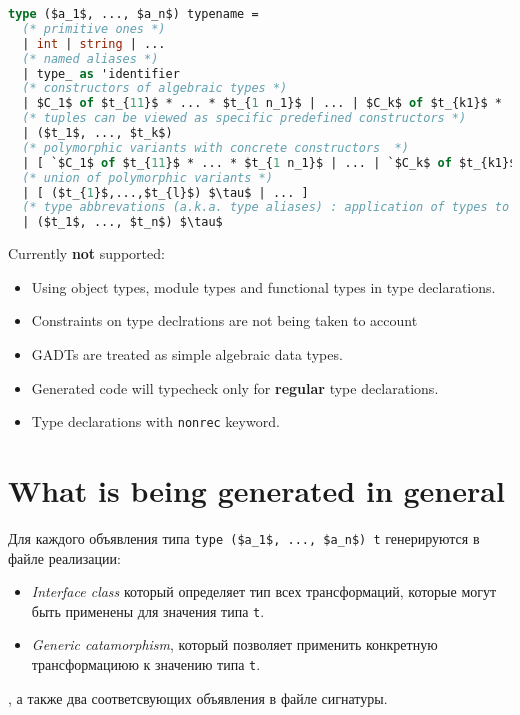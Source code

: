 \documentclass[acmsmall,review,anonymous]{acmart}\settopmatter{printfolios=true,printccs=false,printacmref=false}
\begin{document}
\begin{lstlisting}[language=ocaml]
type ($a_1$, ..., $a_n$) typename =
  (* primitive ones *)
  | int | string | ...
  (* named aliases *)
  | type_ as 'identifier
  (* constructors of algebraic types *)
  | $C_1$ of $t_{11}$ * ... * $t_{1 n_1}$ | ... | $C_k$ of $t_{k1}$ * ... * $t_{k n_k}$
  (* tuples can be viewed as specific predefined constructors *)
  | ($t_1$, ..., $t_k$)
  (* polymorphic variants with concrete constructors  *)
  | [ `$C_1$ of $t_{11}$ * ... * $t_{1 n_1}$ | ... | `$C_k$ of $t_{k1}$ * ... * $t_{k n_k}$ ] | [ ($t_{1}$,...,$t_{l}$) u ]
  (* union of polymorphic variants *)
  | [ ($t_{1}$,...,$t_{l}$) $\tau$ | ... ]
  (* type abbrevations (a.k.a. type aliases) : application of types to other types *)
  | ($t_1$, ..., $t_n$) $\tau$
\end{lstlisting}
Currently \textbf{not} supported:
\begin{itemize}
 \item Using object types, module types and functional types in type declarations.
 \item Constraints on type declrations are not being taken to account
 \item GADTs are treated as simple algebraic data types.
 \item Generated code will typecheck only for \textbf{regular} type declarations.
 \item Type declarations with \verb=nonrec= keyword.
\end{itemize}


\section{What is being generated in general}

Для каждого объявления типа  \lstinline{type ($a_1$, ..., $a_n$) t} генерируются в файле реализации:
\begin{itemize}
 \item \textit{Interface class} который определяет тип всех трансформаций, которые могут быть применены для значения типа \lstinline{t}.
 \item \textit{Generic catamorphism}, который позволяет применить конкретную трансформациюю к значению типа \lstinline{t}.
\end{itemize},
а также два соответсвующих объявления в файле сигнатуры.
\end{document}

